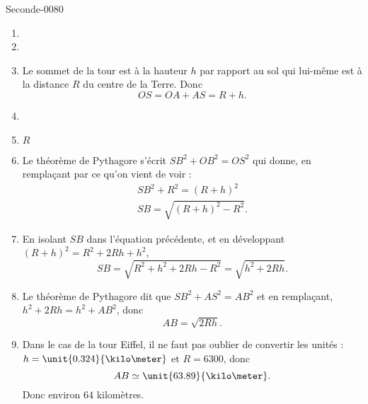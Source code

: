 
\begin{corrige}{Seconde-0080}


    \begin{enumerate}
        \item
        \item
        \item
            Le sommet de la tour est à la hauteur \( h\) par rapport au sol qui lui-même est à la distance \( R\) du centre de la Terre. Donc
            \begin{equation}
                OS=OA+AS=R+h.
            \end{equation}
        \item
        \item
            \( R\)
        \item
            Le théorème de Pythagore s'écrit \( SB^2+OB^2=OS^2\) qui donne, en remplaçant par ce qu'on vient de voir :
            \begin{subequations}
                \begin{align}
                    SB^2+R^2=(R+h)^2\\
                    SB=\sqrt{(R+h)^2-R^2}.
                \end{align}
            \end{subequations}
        \item
            En isolant \( SB\) dans l'équation précédente, et en développant \( (R+h)^2=R^2+2Rh+h^2\),
            \begin{equation}
                SB=\sqrt{R^2+h^2+2Rh-R^2}=\sqrt{h^2+2Rh}.
            \end{equation}
        \item
            Le théorème de Pythagore dit que \( SB^2+AS^2=AB^2\) et en remplaçant, \( h^2+2Rh=h^2+AB^2\), donc
            \begin{equation}
                AB=\sqrt{2Rh}.
            \end{equation}
        \item
            Dans le cas de la tour Eiffel, il ne faut pas oublier de convertir les unités : \( h=\unit{0.324}{\kilo\meter}\) et \( R=6300\), donc
            \begin{equation}
                AB\simeq\unit{63.89}{\kilo\meter}.
            \end{equation}
            Donc environ \( 64\) kilomètres.
    \end{enumerate}

\end{corrige}
